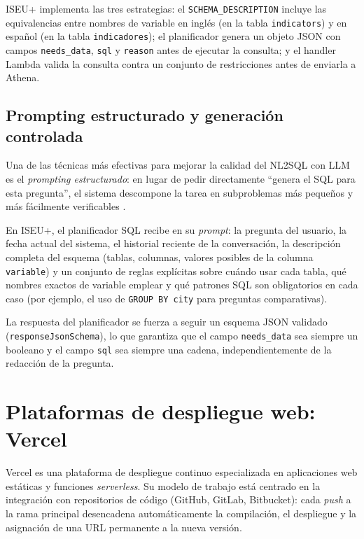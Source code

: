 ISEU+ implementa las tres estrategias: el \texttt{SCHEMA\_DESCRIPTION} incluye las equivalencias entre nombres de variable en inglés (en la tabla \texttt{indicators}) y en español (en la tabla \texttt{indicadores}); el planificador genera un objeto JSON con campos \texttt{needs\_data}, \texttt{sql} y \texttt{reason} antes de ejecutar la consulta; y el handler Lambda valida la consulta contra un conjunto de restricciones antes de enviarla a Athena.

\subsection{Prompting estructurado y generación controlada}

Una de las técnicas más efectivas para mejorar la calidad del NL2SQL con LLM es el \textit{prompting estructurado}: en lugar de pedir directamente ``genera el SQL para esta pregunta'', el sistema descompone la tarea en subproblemas más pequeños y más fácilmente verificables \parencite{Wei2022ChainOfThought}.

En ISEU+, el planificador SQL recibe en su \textit{prompt}: la pregunta del usuario, la fecha actual del sistema, el historial reciente de la conversación, la descripción completa del esquema (tablas, columnas, valores posibles de la columna \texttt{variable}) y un conjunto de reglas explícitas sobre cuándo usar cada tabla, qué nombres exactos de variable emplear y qué patrones SQL son obligatorios en cada caso (por ejemplo, el uso de \texttt{GROUP BY city} para preguntas comparativas).

La respuesta del planificador se fuerza a seguir un esquema JSON validado (\texttt{responseJson\-Schema}), lo que garantiza que el campo \texttt{needs\_data} sea siempre un booleano y el campo \texttt{sql} sea siempre una cadena, independientemente de la redacción de la pregunta.

\section{Plataformas de despliegue web: Vercel}

Vercel \parencite{Vercel2023Platform} es una plataforma de despliegue continuo especializada en aplicaciones web estáticas y funciones \textit{serverless}. Su modelo de trabajo está centrado en la integración con repositorios de código (GitHub, GitLab, Bitbucket): cada \textit{push} a la rama principal desencadena automáticamente la compilación, el despliegue y la asignación de una URL permanente a la nueva versión.

